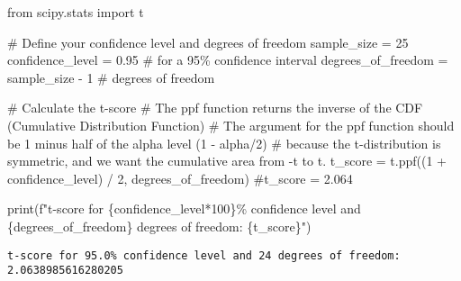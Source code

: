 \documentclass[
  letterpaper,
  DIV=11,
  numbers=noendperiod]{scrartcl}
\newenvironment{Shaded}{\begin{snugshade}}{\end{snugshade}}
\newcommand{\BuiltInTok}[1]{\textcolor[rgb]{0.00,0.23,0.31}{#1}}
\newcommand{\CommentTok}[1]{\textcolor[rgb]{0.37,0.37,0.37}{#1}}
\newcommand{\DecValTok}[1]{\textcolor[rgb]{0.68,0.00,0.00}{#1}}
\newcommand{\FloatTok}[1]{\textcolor[rgb]{0.68,0.00,0.00}{#1}}
\newcommand{\ImportTok}[1]{\textcolor[rgb]{0.00,0.46,0.62}{#1}}
\newcommand{\NormalTok}[1]{\textcolor[rgb]{0.00,0.23,0.31}{#1}}
\newcommand{\OperatorTok}[1]{\textcolor[rgb]{0.37,0.37,0.37}{#1}}
\newcommand{\SpecialCharTok}[1]{\textcolor[rgb]{0.37,0.37,0.37}{#1}}
\newcommand{\SpecialStringTok}[1]{\textcolor[rgb]{0.13,0.47,0.30}{#1}}
\begin{document}
\begin{Shaded}
\begin{Highlighting}[]
\ImportTok{from}\NormalTok{ scipy.stats }\ImportTok{import}\NormalTok{ t}

\CommentTok{\# Define your confidence level and degrees of freedom}
\NormalTok{sample\_size }\OperatorTok{=} \DecValTok{25}
\NormalTok{confidence\_level }\OperatorTok{=} \FloatTok{0.95}  \CommentTok{\# for a 95\% confidence interval}
\NormalTok{degrees\_of\_freedom }\OperatorTok{=}\NormalTok{ sample\_size }\OperatorTok{{-}} \DecValTok{1}  \CommentTok{\# degrees of freedom}

\CommentTok{\# Calculate the t{-}score}
\CommentTok{\# The ppf function returns the inverse of the CDF (Cumulative Distribution Function)}
\CommentTok{\# The argument for the ppf function should be 1 minus half of the alpha level (1 {-} alpha/2)}
\CommentTok{\# because the t{-}distribution is symmetric, and we want the cumulative area from {-}t to t.}
\NormalTok{t\_score }\OperatorTok{=}\NormalTok{ t.ppf((}\DecValTok{1} \OperatorTok{+}\NormalTok{ confidence\_level) }\OperatorTok{/} \DecValTok{2}\NormalTok{, degrees\_of\_freedom)}
\CommentTok{\#t\_score = 2.064}

\BuiltInTok{print}\NormalTok{(}\SpecialStringTok{f"t{-}score for }\SpecialCharTok{\{}\NormalTok{confidence\_level}\OperatorTok{*}\DecValTok{100}\SpecialCharTok{\}}\SpecialStringTok{\% confidence level and }\SpecialCharTok{\{}\NormalTok{degrees\_of\_freedom}\SpecialCharTok{\}}\SpecialStringTok{ degrees of freedom: }\SpecialCharTok{\{}\NormalTok{t\_score}\SpecialCharTok{\}}\SpecialStringTok{"}\NormalTok{)}
\end{Highlighting}
\end{Shaded}

\begin{verbatim}
t-score for 95.0% confidence level and 24 degrees of freedom: 2.0638985616280205
\end{verbatim}
\end{document}
